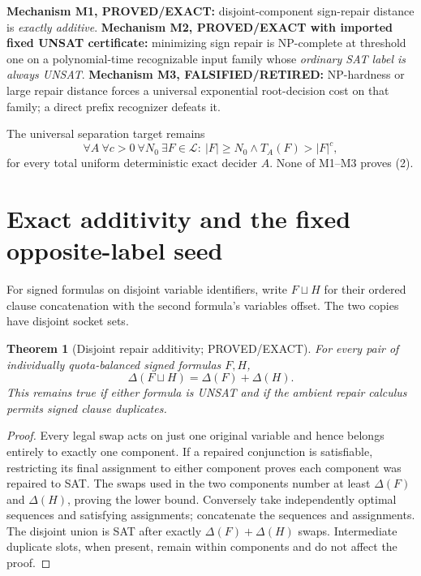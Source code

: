 \documentclass[11pt]{article}
\newtheorem{theorem}{Theorem}
\begin{document}
\noindent\textbf{Mechanism M1, PROVED/EXACT:} disjoint-component sign-repair distance is \emph{exactly additive}. \textbf{Mechanism M2, PROVED/EXACT with imported fixed UNSAT certificate:} minimizing sign repair is NP-complete at threshold one on a polynomial-time recognizable input family whose \emph{ordinary SAT label is always UNSAT}. \textbf{Mechanism M3, FALSIFIED/RETIRED:} NP-hardness or large repair distance forces a universal exponential root-decision cost on that family; a direct prefix recognizer defeats it.

The universal separation target remains
\[
\forall A\ \forall c>0\ \forall N_0\
\exists F\in\mathcal L:\ |F|\ge N_0\land T_A(F)>|F|^c,
\tag{2}
\]
for every total uniform deterministic exact decider \(A\). None of M1--M3 proves (2).

\section{Exact additivity and the fixed opposite-label seed}
For signed formulas on disjoint variable identifiers, write \(F\sqcup H\) for their ordered clause concatenation with the second formula's variables offset. The two copies have disjoint socket sets.
\begin{theorem}[Disjoint repair additivity; PROVED/EXACT]
For every pair of individually quota-balanced signed formulas \(F,H\),
\[
\boxed{\Delta(F\sqcup H)=\Delta(F)+\Delta(H).}\tag{3}
\]
This remains true if either formula is UNSAT and if the ambient repair calculus permits signed clause duplicates.
\end{theorem}
\begin{proof}
Every legal swap acts on just one original variable and hence belongs entirely to exactly one component. If a repaired conjunction is satisfiable, restricting its final assignment to either component proves each component was repaired to SAT. The swaps used in the two components number at least \(\Delta(F)\) and \(\Delta(H)\), proving the lower bound. Conversely take independently optimal sequences and satisfying assignments; concatenate the sequences and assignments. The disjoint union is SAT after exactly \(\Delta(F)+\Delta(H)\) swaps. Intermediate duplicate slots, when present, remain within components and do not affect the proof.
\end{proof}
\end{document}
